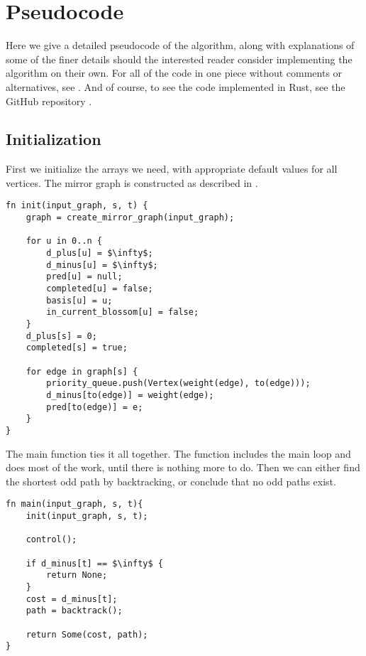 \section{Pseudocode}
\label{section:odd-path-pseudocode}
Here we give a detailed pseudocode of the algorithm, along with explanations of some of the finer details should the interested reader consider implementing the algorithm on their own. For all of the code in one piece without comments or alternatives, see . And of course, to see the code implemented in Rust, see the GitHub repository \cite{source:codebase}.

\subsection{Initialization}
First we initialize the arrays we need, with appropriate default values for all vertices. The mirror graph is constructed as described in .
\begin{lstlisting}[caption={Initialization},label=Listing,mathescape=true]
fn init(input_graph, s, t) {
    graph = create_mirror_graph(input_graph);

    for u in 0..n {
        d_plus[u] = $\infty$;
        d_minus[u] = $\infty$;
        pred[u] = null;
        completed[u] = false;
        basis[u] = u;
        in_current_blossom[u] = false;
    }
    d_plus[s] = 0;
    completed[s] = true;

    for edge in graph[s] {
        priority_queue.push(Vertex(weight(edge), to(edge)));
        d_minus[to(edge)] = weight(edge);
        pred[to(edge)] = e;
    }
}
\end{lstlisting}

The main function ties it all together. The  function includes the main loop and does most of the work, until there is nothing more to do. Then we can either find the shortest odd path by backtracking, or conclude that no odd paths exist.
\begin{lstlisting}[caption={Main},label=Listing,mathescape=true]
fn main(input_graph, s, t){
    init(input_graph, s, t);

    control();

    if d_minus[t] == $\infty$ {
        return None;
    }
    cost = d_minus[t];
    path = backtrack();
    
    return Some(cost, path);
}
\end{lstlisting}

